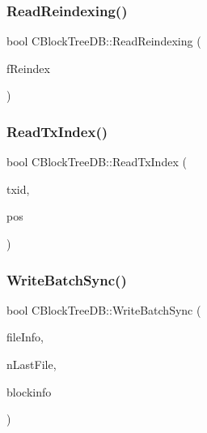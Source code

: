 \mbox{\label{class_c_block_tree_d_b_a1abf6fc392048428aa24a12b7942824b}} 
\subsubsection{\texorpdfstring{Read\+Reindexing()}{ReadReindexing()}}
{\footnotesize\ttfamily bool C\+Block\+Tree\+D\+B\+::\+Read\+Reindexing (\begin{DoxyParamCaption}\item[{bool \&}]{f\+Reindex }\end{DoxyParamCaption})}

\mbox{\label{class_c_block_tree_d_b_a74383427266d627e84c2d0c8e21e03c7}} 
\subsubsection{\texorpdfstring{Read\+Tx\+Index()}{ReadTxIndex()}}
{\footnotesize\ttfamily bool C\+Block\+Tree\+D\+B\+::\+Read\+Tx\+Index (\begin{DoxyParamCaption}\item[{const \mbox{\hyperlink{classuint256}{uint256}} \&}]{txid,  }\item[{\mbox{\hyperlink{struct_c_disk_tx_pos}{C\+Disk\+Tx\+Pos}} \&}]{pos }\end{DoxyParamCaption})}

\mbox{\label{class_c_block_tree_d_b_af5509ed62ce84023882fe243e4cd21ba}} 
\subsubsection{\texorpdfstring{Write\+Batch\+Sync()}{WriteBatchSync()}}
{\footnotesize\ttfamily bool C\+Block\+Tree\+D\+B\+::\+Write\+Batch\+Sync (\begin{DoxyParamCaption}\item[{const std\+::vector$<$ std\+::pair$<$ int, const \mbox{\hyperlink{class_c_block_file_info}{C\+Block\+File\+Info}} $\ast$$>$ $>$ \&}]{file\+Info,  }\item[{int}]{n\+Last\+File,  }\item[{const std\+::vector$<$ const \mbox{\hyperlink{class_c_block_index}{C\+Block\+Index}} $\ast$$>$ \&}]{blockinfo }\end{DoxyParamCaption})}

